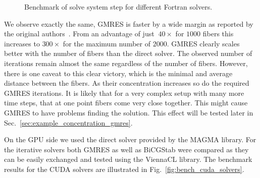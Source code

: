 \begin{figure}[!htbp]
  \centering
  \caption{Benchmark of solve system step for different Fortran solvers.}
  \label{fig:bench_openmp_solvers}
\end{figure}

We observe exactly the same, GMRES is faster by a wide margin as reported by the original authors~\cite{Tornberg2006}. From an advantage of just $~40×$ for $1000$ fibers this increases to $300×$ for the maximum number of $2000$. GMRES clearly scales better with the number of fibers than the direct solver. The observed number of iterations remain almost the same regardless of the number of fibers. However, there is one caveat to this clear victory, which is the minimal and average distance between the fibers. As their concentration increases so do the required GMRES iterations. It is likely that for a very complex setup with many more time steps, that at one point fibers come very close together. This might cause GMRES to have problems finding the solution. This effect will be tested later in Sec.~\ref{sec:example_concentration_gmres}.

On the GPU side we used the direct solver provided by the MAGMA library. For the iterative solvers both GMRES as well as BiCGStab were compared as they can be easily exchanged and tested using the ViennaCL library. The benchmark results for the CUDA solvers are illustrated in Fig.~\ref{fig:bench_cuda_solvers}.

